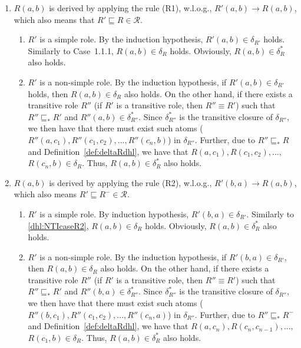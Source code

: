 \begin{enumerate}[leftmargin=12ex,label=Case~2.\arabic*, ref=Case~2.\arabic*]
\item $R(a,b)$ is derived by applying the rule (R1), w.l.o.g., $R'(a,b)\rightarrow R(a,b)$,
    which also means that $R'\sqsubseteq R\in\mathcal{R}$.\label{dhl:TcaseR1}
    \begin{enumerate}[leftmargin=8ex,label=Case~2.1.\arabic*]
    \item $R'$ is a simple role. By the induction hypothesis, $R'(a,b)\in\delta_{R'}$ holds.
        Similarly to Case~1.1.1, $R(a,b)\in\delta_{R}$ holds.
        Obviously, $R(a,b)\in\delta_{R}^*$ also holds.

    \item $R'$ is a non-simple role. By the induction hypothesis, if $R'(a,b)\in\delta_{R'}$ holds,
        then $R(a,b)\in\delta_R$ also holds. On the other hand, if there exists a transitive role
        $R''$ (if $R'$ is a transitive role, then $R''\equiv R'$) such that
        $R''\sqsubseteq_* R'$ and $R''(a,b)\in\delta_{R''}^*$. Since $\delta_{R''}^*$ is
        the transitive closure of $\delta_{R''}$, we then have that there must
        exist such atoms ($R''(a,c_1),R''(c_1,c_2),...,R''(c_n,b)$) in $\delta_{R''}$.
        Further, due to $R''\sqsubseteq_* R$ and Definition~\ref{def:deltaRdhl},
        we have that $R(a,c_1),R(c_1,c_2),...,$ $R(c_n,b)\in\delta_{R}$. Thus, $R(a,b)\in\delta_{R}^*$
        also holds.
    \end{enumerate}

\item $R(a,b)$ is derived by applying the rule (R2), w.l.o.g., $R'(b,a)\rightarrow R(a,b)$,
    which also means $R'\sqsubseteq R^-\in\mathcal{R}$.\label{dhl:TcaseR2}
    \begin{enumerate}[leftmargin=8ex,label=Case~2.2.\arabic*,ref=Case~2.2.\arabic*]
    \item $R'$ is a simple role. By induction hypothesis, $R'(b,a)\in\delta_{R'}$.
        Similarly to \ref{dhl:NTIcaseR2}, $R(a,b)\in\delta_{R}$ holds.
        Obviously, $R(a,b)\in\delta_{R}^*$ also holds.

    \item $R'$ is a non-simple role. By the induction hypothesis, if $R'(b,a)\in\delta_{R'}$,
        then $R(a,b)\in\delta_R$ also holds. On the other hand, if there exists a transitive role
        $R''$ (if $R'$ is a transitive role, then $R''\equiv R'$) such that
        $R''\sqsubseteq_* R'$ and $R''(b,a)\in\delta_{R''}^*$. Since $\delta_{R''}^*$ is
        the transitive closure of $\delta_{R''}$, we then have that there must
        exist such atoms ($R''(b,c_1),R''(c_1,c_2),...,R''(c_n,a)$) in $\delta_{R''}$.
        Further, due to $R''\sqsubseteq_* R^-$ and Definition~\ref{def:deltaRdhl},
        we have that $R(a,c_n),R(c_n,c_{n-1}),...,$ $R(c_1,b)\in\delta_{R}$. Thus, $R(a,b)\in\delta_{R}^*$
        also holds.
    \end{enumerate}


\end{enumerate}
